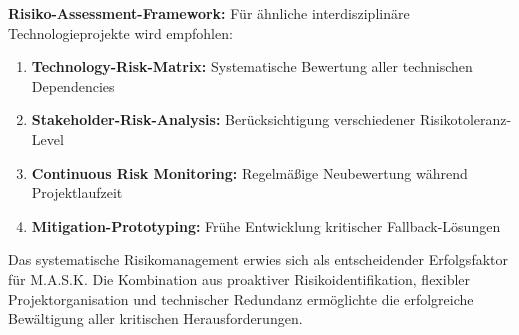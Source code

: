 \textbf{Risiko-Assessment-Framework:}
Für ähnliche interdisziplinäre Technologieprojekte wird empfohlen:

\begin{enumerate}
    \item \textbf{Technology-Risk-Matrix:} Systematische Bewertung aller technischen Dependencies
    \item \textbf{Stakeholder-Risk-Analysis:} Berücksichtigung verschiedener Risikotoleranz-Level
    \item \textbf{Continuous Risk Monitoring:} Regelmäßige Neubewertung während Projektlaufzeit
    \item \textbf{Mitigation-Prototyping:} Frühe Entwicklung kritischer Fallback-Lösungen
\end{enumerate}

Das systematische Risikomanagement erwies sich als entscheidender Erfolgsfaktor für M.A.S.K. Die Kombination aus proaktiver Risikoidentifikation, flexibler Projektorganisation und technischer Redundanz ermöglichte die erfolgreiche Bewältigung aller kritischen Herausforderungen.